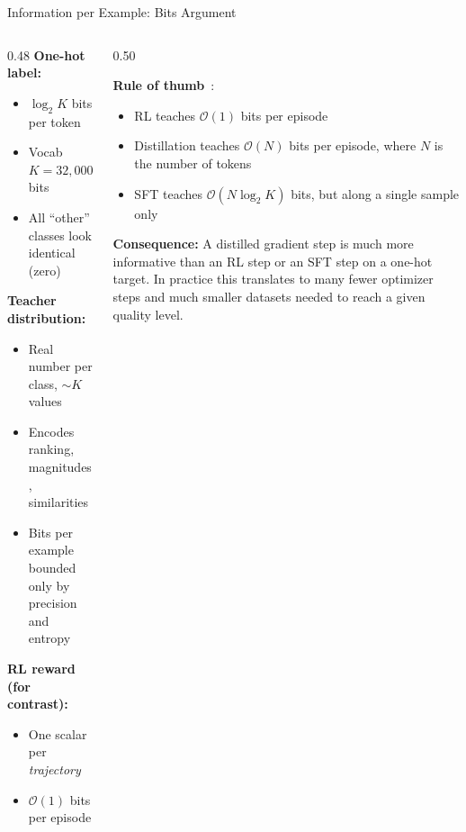 \begin{frame}{Information per Example: Bits Argument}
  \begin{columns}[T]
    \begin{column}{0.48\textwidth}
      \textbf{One-hot label:}
      \begin{itemize}[nosep]
        \item $\log_2 K$ bits per token
        \item Vocab $K = 32{,}000 \Rightarrow \approx 15$ bits
        \item All ``other'' classes look identical (zero)
      \end{itemize}

      \vspace{0.4em}
      \textbf{Teacher distribution:}
      \begin{itemize}[nosep]
        \item Real number per class, $\sim K$ values
        \item Encodes ranking, magnitudes, similarities
        \item Bits per example bounded only by precision and entropy
      \end{itemize}

      \vspace{0.4em}
      \textbf{RL reward (for contrast):}
      \begin{itemize}[nosep]
        \item One scalar per \emph{trajectory}
        \item $\mathcal{O}(1)$ bits per episode
      \end{itemize}
    \end{column}
    \begin{column}{0.50\textwidth}
      \begin{tcolorbox}[colback=blue!5, colframe=blue!40, boxrule=0.5pt, arc=2pt, left=4pt, right=4pt, top=3pt, bottom=3pt]
      \textbf{Rule of thumb}~\cite{thinkingmachines2025distillation}:
      \begin{itemize}[nosep]
        \item RL teaches $\mathcal{O}(1)$ bits per episode
        \item Distillation teaches $\mathcal{O}(N)$ bits per episode, where $N$ is the number of tokens
        \item SFT teaches $\mathcal{O}(N \log_2 K)$ bits, but along a single sample only
      \end{itemize}
      \end{tcolorbox}

      \vspace{0.3em}
      \textbf{Consequence:} A distilled gradient step is much more informative than an RL step or an SFT step on a one-hot target. In practice this translates to many fewer optimizer steps and much smaller datasets needed to reach a given quality level.
    \end{column}
  \end{columns}
\end{frame}

